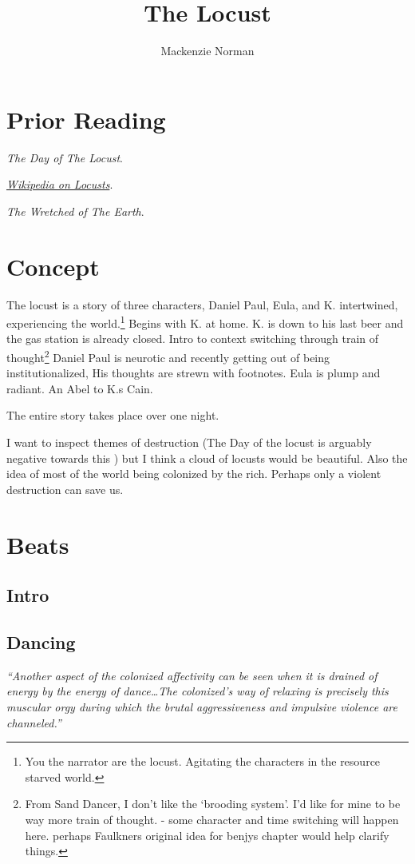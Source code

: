 \documentclass{article}
\title{The Locust}
\author{Mackenzie Norman}
\begin{document}
\maketitle
\textit{}
\section*{Prior Reading}
\begin{list} {}
\item\textit{The Day of The Locust}. 

\item\textit{\href{https://en.wikipedia.org/wiki/Locust}{Wikipedia on Locusts}}. 
\item\textit{The Wretched of The Earth}. 
\end{list}
\section*{Concept}
The locust is a story of three characters, Daniel Paul, Eula, and K. intertwined, experiencing the world.\footnote{You the narrator are the locust. Agitating the characters in the resource starved world.} Begins with K. at home. K. is down to his last beer and the gas station is already closed. Intro to context switching through train of thought\footnote{From Sand Dancer, I don't like the `brooding system'. I'd like for mine to be way more train of thought. - some character and time switching will happen here. perhaps Faulkners original idea for benjys chapter would help clarify things.} Daniel Paul is neurotic and recently getting out of being institutionalized, His thoughts are strewn with footnotes. Eula is plump and radiant. An Abel to K.s Cain. 

The entire story takes place over one night. 



I want to inspect themes of destruction (The Day of the locust is arguably negative towards this ) but I think a cloud of locusts would be beautiful. Also the idea of most of the world being colonized by the rich. Perhaps only a violent destruction can save us.

\section*{Beats}
\subsection*{Intro}
\subsection*{Dancing}
\textit{``Another aspect of the colonized affectivity can be seen when it is drained of energy by the energy of dance\dots The colonized's way of relaxing is precisely this muscular orgy during which the brutal aggressiveness and impulsive violence are channeled.''} 
\end{document}
